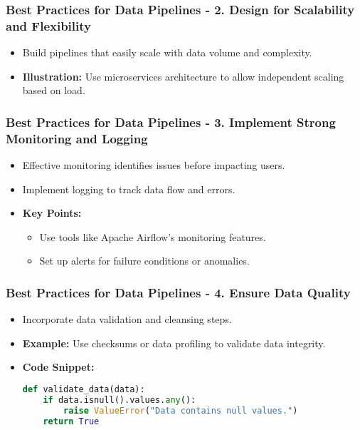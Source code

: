 \documentclass[aspectratio=169]{beamer}
\begin{document}
\begin{frame}[fragile]
    \frametitle{Best Practices for Data Pipelines - 2. Design for Scalability and Flexibility}
    \begin{itemize}
        \item Build pipelines that easily scale with data volume and complexity.
        \item \textbf{Illustration:} Use microservices architecture to allow independent scaling based on load.
    \end{itemize}
\end{frame}

\begin{frame}[fragile]
    \frametitle{Best Practices for Data Pipelines - 3. Implement Strong Monitoring and Logging}
    \begin{itemize}
        \item Effective monitoring identifies issues before impacting users.
        \item Implement logging to track data flow and errors.
        \item \textbf{Key Points:}
        \begin{itemize}
            \item Use tools like Apache Airflow's monitoring features.
            \item Set up alerts for failure conditions or anomalies.
        \end{itemize}
    \end{itemize}
\end{frame}

\begin{frame}[fragile]
    \frametitle{Best Practices for Data Pipelines - 4. Ensure Data Quality}
    \begin{itemize}
        \item Incorporate data validation and cleansing steps.
        \item \textbf{Example:} Use checksums or data profiling to validate data integrity.
        \item \textbf{Code Snippet:}
        \begin{lstlisting}[language=Python]
def validate_data(data):
    if data.isnull().values.any():
        raise ValueError("Data contains null values.")
    return True
        \end{lstlisting}
    \end{itemize}
\end{frame}
\end{document}
